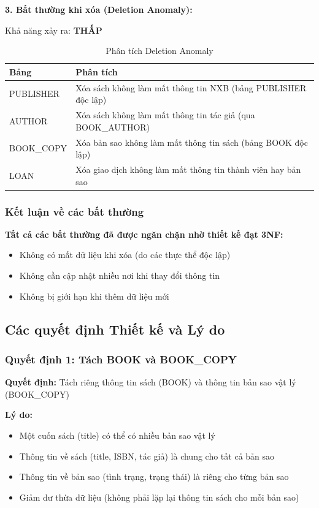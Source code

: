 \documentclass[12pt,a4paper]{article}
\begin{document}
\textbf{3. Bất thường khi xóa (Deletion Anomaly):}

Khả năng xảy ra: \textbf{THẤP}

\begin{table}[H]
\centering
\caption{Phân tích Deletion Anomaly}
\begin{tabular}{@{}|l|p{10cm}|@{}}
\hline
\textbf{Bảng} & \textbf{Phân tích} \\ \hline
PUBLISHER & Xóa sách không làm mất thông tin NXB (bảng PUBLISHER độc lập) \\ \hline
AUTHOR & Xóa sách không làm mất thông tin tác giả (qua BOOK\_AUTHOR) \\ \hline
BOOK\_COPY & Xóa bản sao không làm mất thông tin sách (bảng BOOK độc lập) \\ \hline
LOAN & Xóa giao dịch không làm mất thông tin thành viên hay bản sao \\ \hline
\end{tabular}
\end{table}

\subsubsection{Kết luận về các bất thường}

\textbf{Tất cả các bất thường đã được ngăn chặn nhờ thiết kế đạt 3NF:}
\begin{itemize}
    \item Không có mất dữ liệu khi xóa (do các thực thể độc lập)
    \item Không cần cập nhật nhiều nơi khi thay đổi thông tin
    \item Không bị giới hạn khi thêm dữ liệu mới
\end{itemize}

\subsection{Các quyết định Thiết kế và Lý do}

\subsubsection{Quyết định 1: Tách BOOK và BOOK\_COPY}

\textbf{Quyết định:} Tách riêng thông tin sách (BOOK) và thông tin bản sao vật lý (BOOK\_COPY)

\textbf{Lý do:}
\begin{itemize}
    \item Một cuốn sách (title) có thể có nhiều bản sao vật lý
    \item Thông tin về sách (title, ISBN, tác giả) là chung cho tất cả bản sao
    \item Thông tin về bản sao (tình trạng, trạng thái) là riêng cho từng bản sao
    \item Giảm dư thừa dữ liệu (không phải lặp lại thông tin sách cho mỗi bản sao)
\end{itemize}
\end{document}
